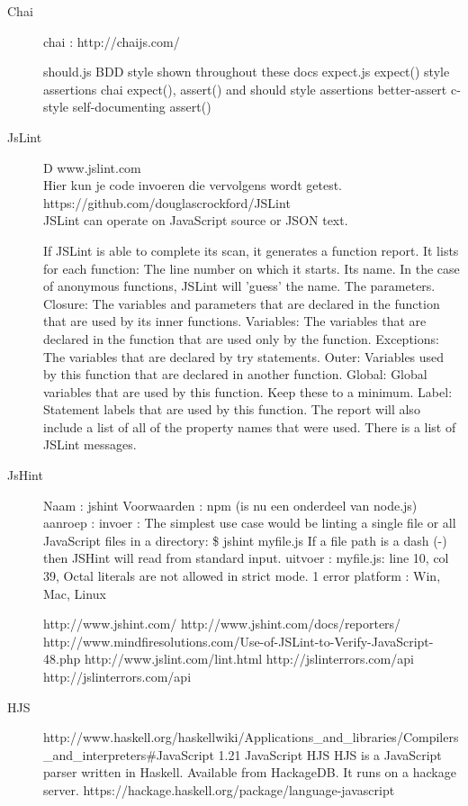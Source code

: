 \documentclass{article}
\begin{document}
\begin{description}
\item[Chai]
chai  : http://chaijs.com/


should.js BDD style shown throughout these docs
expect.js expect() style assertions
chai expect(), assert() and should style assertions
better-assert c-style self-documenting assert()


\item[JsLint]D www.jslint.com\\Hier kun je code invoeren die vervolgens wordt getest.
https://github.com/douglascrockford/JSLint\\
JSLint can operate on JavaScript source or JSON text.

If JSLint is able to complete its scan, it generates a function report. It lists for each function:
The line number on which it starts.
Its name. In the case of anonymous functions, JSLint will 'guess' the name.
The parameters.
Closure: The variables and parameters that are declared in the function that are used by its inner functions.
Variables: The variables that are declared in the function that are used only by the function.
Exceptions: The variables that are declared by try statements.
Outer: Variables used by this function that are declared in another function.
Global: Global variables that are used by this function. Keep these to a minimum.
Label: Statement labels that are used by this function.
The report will also include a list of all of the property names that were used. There is a list of JSLint messages.

\item[JsHint]
Naam        : jshint
Voorwaarden : npm (is nu een onderdeel van node.js)
aanroep     :
invoer      : The simplest use case would be linting a single file or all JavaScript files in a directory:
              \$ jshint myfile.js
              If a file path is a dash (-) then JSHint will read from standard input.
uitvoer     : myfile.js: line 10, col 39, Octal literals are not allowed in strict mode.
              1 error
platform    : Win, Mac, Linux

http://www.jshint.com/
http://www.jshint.com/docs/reporters/
http://www.mindfiresolutions.com/Use-of-JSLint-to-Verify-JavaScript-48.php
http://www.jslint.com/lint.html
http://jslinterrors.com/api
http://jslinterrors.com/api

\item[HJS]
http://www.haskell.org/haskellwiki/Applications\_and\_libraries/Compilers\_and\_interpreters\#JavaScript
1.21 JavaScript
HJS
HJS is a JavaScript parser written in Haskell. Available from HackageDB.
It runs on a hackage server.
https://hackage.haskell.org/package/language-javascript


\end{description}
\end{document}
